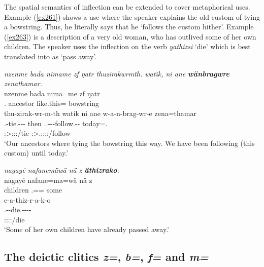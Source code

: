 The spatial semantics of  inflection can be extended to cover metaphorical uses. Example (\ref{ex261}) shows a  use where the speaker explains the old custom of tying a bowstring. Thus, he literally says that he `follows the custom hither'. Example (\ref{ex263}) is a description of a very old woman, who has outlived some of her own children. The speaker uses the  inflection on the verb \emph{yathizsi} `die' which is best translated into  as `pass away'.

\begin{exe}
	\ex \emph{nzenme bada nimame zf ŋatr thuzirakwrmth. watik, ni ane \textbf{wänbragwre} zenathamar.}\\
	\gll nzenme bada nima=me zf ŋatr\\
	\Fnsg.\Poss{} ancestor like.this=\Ins{} \Imm{} bowstring\\
	\sn
	\glll thu-zirak-wr-m-th watik ni ane w-a-n-brag-wr-e zena=thamar\\
	\Stnsg.\Betaone{}-tie.\Ext-\Ndu-\Dur-\Stnsg{} then \Fnsg{} \Dem{} \Tsg.\F.\Alph-\Vc-\Venit-follow.\Ext-\Ndu-\Fnsg{} today=\Temp.\All{}\\
	\footnotesize{\Stpl:\Sbj>\Stpl:\Obj:\Pst:\Dur/tie} {} {} {} \footnotesize{\Fpl:\Sbj>\Tsg.\F:\Obj:\Nonpast:\Ipfv:\Venit/follow} {}\\
	\trans `Our ancestors where tying the bowstring this way. We have been following (this custom) until today.' 
	\label{ex261}
\end{exe}
\begin{exe}
	\ex \emph{nagayé nafanemäwä nä z \textbf{äthizrako}.}\\
	\gll nagayé nafane=ma=wä nä z\\
	children \Tsg.\Poss=\Char=\Emph{} some \Iam{}\\
	\sn
	\glll e-a-thiz-r-a-k-o\\
	\Stnsg.\Alph-\Vc-die.\Ext-\Ndu-\Pst-\Lk-\Andat{}\\
	\footnotesize{\Stpl:\Sbj:\Pst:\Ipfv:\Andat/die}\\
	\trans `Some of her own children have already passed away.'\\ 
	\label{ex263}
\end{exe}

\subsection{The deictic clitics \emph{z=}, \emph{b=}, \emph{f=} and \emph{m=}} \label{deicticcliticssection}

